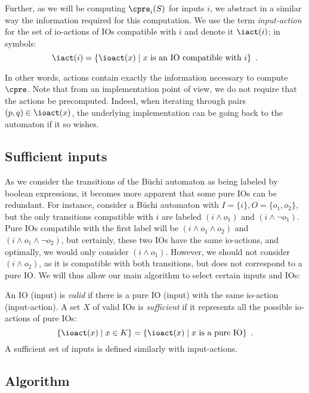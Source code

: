 \documentclass[sigconf,screen,nonacm]{acmart}
\begin{document}
Further, as we will be computing \(\cpre_i(S)\) for inputs \(i\), we abstract in a
similar way the information required for this computation.  We use the term
\emph{input-action} for the set of io-actions of IOs compatible with \(i\) and denote
it \(\iact(i)\); in symbols:
\[\iact(i) = \{\ioact(x) \mid x \text{ is an IO compatible with } i\}\enspace.\]

In other words, actions contain exactly the information necessary to compute
\(\cpre\).  Note that from an implementation point of view, we do not require that
the actions be precomputed.  Indeed, when iterating through pairs
\((p, q) \in \ioact(x)\), the underlying implementation can be going back to the
automaton if it so wishes.

\subsection{Sufficient inputs}\label{sec:sufficient}

As we consider the transitions of the Büchi automaton as being labeled by
boolean expressions, it becomes more apparent that some pure IOs can be
redundant.  For instance, consider a Büchi automaton with
\(I = \{i\}, O = \{o_1, o_2\}\), but the only transitions compatible with \(i\) are
labeled \((i \land o_1)\) and \((i \land \neg o_1)\).  Pure IOs compatible with the first
label will be \((i \land o_1 \land o_2)\) and \((i \land o_1 \land \neg o_2)\), but
certainly, these two IOs have the same io-actions, and optimally, we would only
consider \((i \land o_1)\).  However, we should not consider \((i \land o_2)\), as it is
compatible with both transitions, but does not correspond to a pure IO.  We will
thus allow our main algorithm to select certain inputs and IOs:
\begin{definition}
  An IO (\resp input) is \emph{valid} if there is a pure IO (\resp input) with
  the same io-action (\resp input-action).  A set \(X\) of valid IOs is
  \emph{sufficient} if it represents all the possible io-actions of pure IOs:
  \[\{\ioact(x) \mid x \in K\} = \{\ioact(x) \mid x \text{ is a pure IO}\}\enspace.\]
  A sufficient set of inputs is defined similarly with input-actions.
\end{definition}

\subsection{Algorithm}
\end{document}
